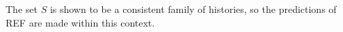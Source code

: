 The set $S$ is shown to be a consistent family of histories, so the predictions of REF are made within this context.
%
%
%

